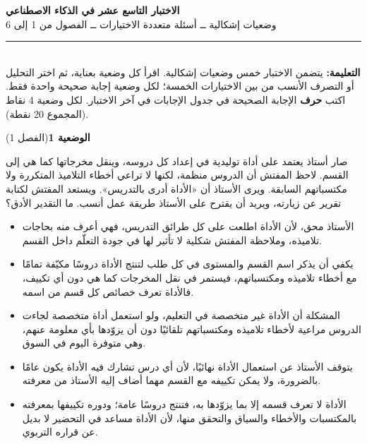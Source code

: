 \documentclass[11pt,a4paper]{article}
\begin{document}
\linespread{1.08}\selectfont
\begin{center}
{\LARGE\khatt\textbf{الاختبار التاسع عشر في الذكاء الاصطناعي}}\\[4pt]
{\normalsize وضعيات إشكالية ــ أسئلة متعددة الاختيارات ــ الفصول من 1 إلى 6}
\end{center}
\vspace{-2pt}\rule{\textwidth}{0.6pt}\\[2pt]
\textbf{التعليمة:} يتضمن الاختبار خمس وضعيات إشكالية. اقرأ كل وضعية بعناية، ثم اختر التحليل أو التصرف الأنسب
من بين الاختيارات الخمسة؛ لكل وضعية إجابة صحيحة واحدة فقط.
اكتب \textbf{حرف} الإجابة الصحيحة في جدول الإجابات في آخر الاختبار.
لكل وضعية 4 نقاط (المجموع 20 نقطة).
\vspace{4pt}

\noindent
{\large\khatt\textbf{الوضعية 1}}\hfill{\small(الفصل 1)}\par\nopagebreak\vspace{3pt}
\setlength{\fboxsep}{7pt}\colorbox{gray!10}{\parbox{\dimexpr\linewidth-14pt}{صار أستاذ يعتمد على أداة توليدية في إعداد كل دروسه، وينقل مخرجاتها كما هي إلى القسم. لاحظ المفتش أن الدروس منظمة، لكنها لا تراعي أخطاء التلاميذ المتكررة ولا مكتسباتهم السابقة. ويرى الأستاذ أن «الأداة أدرى بالتدريس». ويستعد المفتش لكتابة تقرير عن زيارته، ويريد أن يقترح على الأستاذ طريقة عمل أنسب. ما التقدير الأدق؟}}\par\nopagebreak
\begin{itemize}[leftmargin=1.0cm, labelsep=6pt, itemsep=3pt, topsep=4pt, parsep=0pt]
  \item[\textbf{أ)}] الأستاذ محق، لأن الأداة اطلعت على كل طرائق التدريس، فهي أعرف منه بحاجات تلاميذه، وملاحظة المفتش شكلية لا تأثير لها في جودة التعلّم داخل القسم.
  \item[\textbf{ب)}] يكفي أن يذكر اسم القسم والمستوى في كل طلب لتنتج الأداة دروسًا مكيّفة تمامًا مع أخطاء تلاميذه ومكتسباتهم، فيستمر في نقل المخرجات كما هي دون أي تكييف، فالأداة تعرف خصائص كل قسم من اسمه.
  \item[\textbf{ج)}] المشكلة أن الأداة غير متخصصة في التعليم، ولو استعمل أداة متخصصة لجاءت الدروس مراعية لأخطاء تلاميذه ومكتسباتهم تلقائيًا دون أن يزوّدها بأي معلومة عنهم، وهي متوفرة اليوم في السوق.
  \item[\textbf{د)}] يتوقف الأستاذ عن استعمال الأداة نهائيًا، لأن أي درس تشارك فيه الأداة يكون عامًا بالضرورة، ولا يمكن تكييفه مع القسم مهما أضاف إليه الأستاذ من معرفته.
  \item[\textbf{هـ)}] الأداة لا تعرف قسمه إلا بما يزوّدها به، فتنتج دروسًا عامة؛ ودوره تكييفها بمعرفته بالمكتسبات والأخطاء والسياق والتحقق منها، لأن الأداة مساعد في التحضير لا بديل عن قراره التربوي.
\end{itemize}
\end{document}
